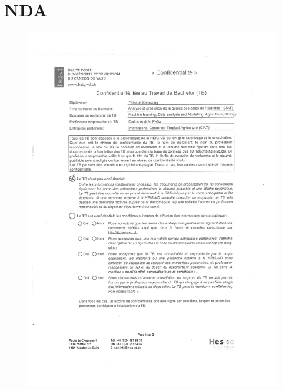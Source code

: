 \documentclass[11pt,a4paper,twoside,openright]{report}
\begin{document}
	\chapter{NDA}
	\begin{figure}[h]
		\centering
		\includegraphics[page= 1, width=0.75\linewidth]{doc/NDA_TB_Schowing_Signed}
		\label{fig:ndatbschowingsigned}
	\end{figure}
\end{document}
